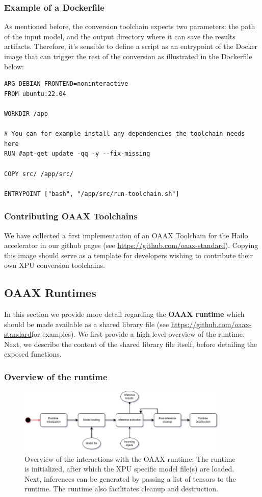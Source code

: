 \documentclass{article}
\newcommand{\oaaxgit}{\href{https://github.com/oaax-standard}{https://github.com/oaax-standard}}
\begin{document}
\subsubsection{Example of a Dockerfile}
As mentioned before, the conversion toolchain expects two parameters: the path of the input model, and the output directory where it can save the results artifacts. Therefore, it's sensible to define a script as an entrypoint of the Docker image that can trigger the rest of the conversion as illustrated in the Dockerfile below:
\begin{lstlisting}
ARG DEBIAN_FRONTEND=noninteractive
FROM ubuntu:22.04

WORKDIR /app

# You can for example install any dependencies the toolchain needs here
RUN #apt-get update -qq -y --fix-missing

COPY src/ /app/src/

ENTRYPOINT ["bash", "/app/src/run-toolchain.sh"]
\end{lstlisting}

\subsubsection{Contributing OAAX Toolchains}

We have collected a first implementation of an OAAX Toolchain for the Hailo accelerator in our github pages (see \oaaxgit). Copying this image should serve as a template for developers wishing to contribute their own XPU conversion toolchains.

\subsection{OAAX Runtimes}

In this section we provide more detail regarding the \textbf{OAAX runtime} which should be made available as a shared library file (see \oaaxgit for examples). We first provide a high level overview of the runtime. Next, we describe the content of the shared library file itself, before detailing the exposed functions.

\subsubsection{Overview of the runtime}

\begin{figure} [!htbp]
\centering
\includegraphics[width=0.9\textwidth]{img/runtime}
\caption{Overview of the interactions with the OAAX runtime: The runtime is initialized, after which the XPU specific model file(s) are loaded. Next, inferences can be generated by passing a list of tensors to the runtime. The runtime also facilitates cleanup and destruction.}
\label{fig-pipeline}
\end{figure}
\end{document}
